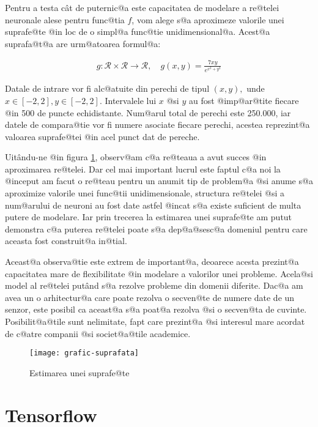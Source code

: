 Pentru a testa c\^ at de puternic@a este capacitatea de modelare a re@telei neuronale alese pentru func@tia $f$, vom alege s@a aproximeze valorile unei suprafe@te @in loc de o simpl@a func@tie unidimensional@a. Acest@a suprafa@t@a are urm@atoarea formul@a:

\begin{align} \label{eq:suprafata}
	g: \mathcal{R} \times \mathcal{R} \to \mathcal{R}, \quad
	g(x, y) = \displaystyle\frac{7xy}{e^{x^2 + y^2}}
\end{align} 

Datale de intrare vor fi alc@atuite din perechi de tipul $(x, y),$ unde $x \in [-2, 2], y \in [-2, 2]$. Intervalele lui $x$ @si $y$ au fost @imp@ar@tite fiecare @in 500 de puncte echidistante. Num@arul total de perechi este 250.000, iar datele de compara@tie vor fi numere asociate fiecare perechi, acestea reprezint@a valoarea suprafe@tei @in acel punct dat de pereche. 

Uit\^ andu-ne @in figura \ref{fig:grafic-suprafata}, observ@am c@a re@teaua a avut succes @in aproximarea re@telei. Dar cel mai important lucrul este faptul c@a noi la @inceput am facut o re@teau pentru un anumit tip de problem@a @si anume s@a aproximize valorile unei func@tii unidimensionale, structura re@telei @si a num@arului de neuroni au fost date astfel @incat s@a existe suficient de multa putere de modelare. Iar prin trecerea la estimarea unei suprafe@te am putut demonstra c@a puterea re@telei poate s@a dep@a@sesc@a domeniul pentru care aceasta fost construit@a in@tial.

Aceast@a observa@tie este extrem de important@a, deoarece acesta prezint@a capacitatea mare de flexibilitate @in modelare a valorilor unei probleme. Acela@si model al re@telei put\^ and s@a rezolve probleme din domenii diferite. Dac@a am avea un o arhitectur@a care poate rezolva o secven@te de numere date de un senzor, este posibil ca aceast@a s@a poat@a rezolva @si o secven@ta de cuvinte. Posibilit@a@tile sunt nelimitate, fapt care prezint@a @si interesul mare acordat de c@atre companii @si societ@a@tile academice.

\begin{figure}[h]
	\centering
	\texttt{[image: grafic-suprafata]}
	\caption{Estimarea unei suprafe@te}
	\label{fig:grafic-suprafata}
\end{figure}


\section{Tensorflow}

